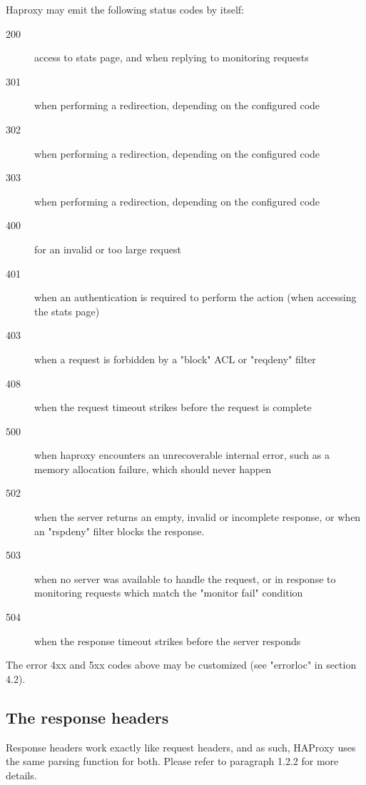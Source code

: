 \begin{samepage}
Haproxy may emit the following status codes by itself:
\begin{description}
\item[200] access to stats page, and when replying to monitoring requests
\item[301] when performing a redirection, depending on the configured code
\item[302] when performing a redirection, depending on the configured code
\item[303] when performing a redirection, depending on the configured code
\item[400] for an invalid or too large request
\item[401] when an authentication is required to perform the action (when
        accessing the stats page)
\item[403] when a request is forbidden by a "block" ACL or "reqdeny" filter
\item[408] when the request timeout strikes before the request is complete
\item[500] when haproxy encounters an unrecoverable internal error, such as a
        memory allocation failure, which should never happen
\item[502] when the server returns an empty, invalid or incomplete response, or
        when an "rspdeny" filter blocks the response.
\item[503] when no server was available to handle the request, or in response to
        monitoring requests which match the "monitor fail" condition
\item[504] when the response timeout strikes before the server responds
\end{description}

The error 4xx and 5xx codes above may be customized (see "errorloc" in section
4.2).
\end{samepage}

\subsection{The response headers}
Response headers work exactly like request headers, and as such, HAProxy uses
the same parsing function for both. Please refer to paragraph 1.2.2 for more
details.
